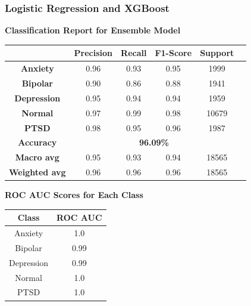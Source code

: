 \subsubsection{Logistic Regression and XGBoost}
\begin{center}
    \textbf{Classification Report for Ensemble Model} \\[0.5em]
    \begin{tabular}{|c|c|c|c|c|c|}
        \hline
        & \textbf{Precision} & \textbf{Recall} & \textbf{F1-Score} & \textbf{Support} \\ \hline
        \textbf{Anxiety}    & 0.96 & 0.93 & 0.95 & 1999 \\ \hline
        \textbf{Bipolar}    & 0.90 & 0.86 & 0.88 & 1941 \\ \hline
        \textbf{Depression} & 0.95 & 0.94 & 0.94 & 1959 \\ \hline
        \textbf{Normal}     & 0.97 & 0.99 & 0.98 & 10679 \\ \hline
        \textbf{PTSD}       & 0.98 & 0.95 & 0.96 & 1987 \\ \hline
        \textbf{Accuracy}   & \multicolumn{4}{c|}{\textbf{96.09\%}} \\ \hline
        \textbf{Macro avg}  & 0.95 & 0.93 & 0.94 & 18565 \\ \hline
        \textbf{Weighted avg} & 0.96 & 0.96 & 0.96 & 18565 \\ \hline
    \end{tabular}
\end{center}

\begin{center}
    \textbf{ROC AUC Scores for Each Class} \\[0.5em]
    \begin{tabular}{|c|c|}
        \hline
        \textbf{Class} & \textbf{ROC AUC} \\ \hline
        Anxiety  & 1.0 \\ \hline
        Bipolar  & 0.99 \\ \hline
        Depression & 0.99 \\ \hline
        Normal   & 1.0 \\ \hline
        PTSD     & 1.0 \\ \hline
    \end{tabular}
\end{center}

